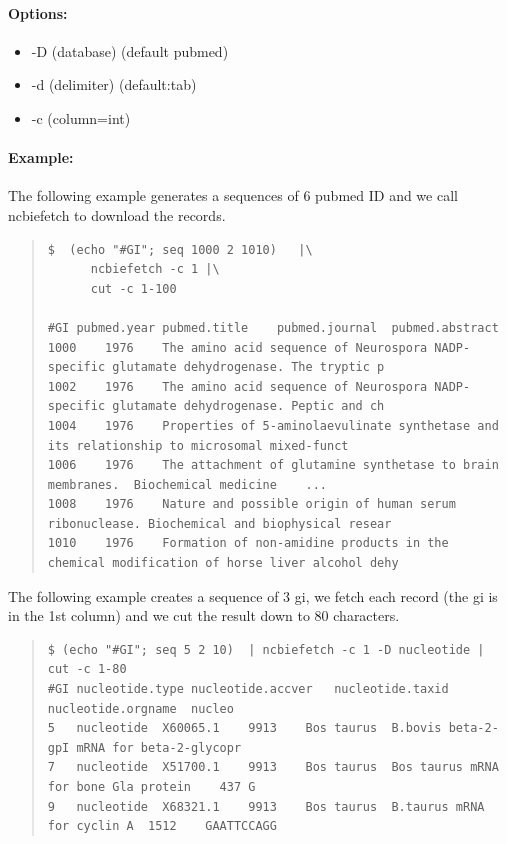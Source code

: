\documentclass[12pt]{article}
\begin{document}
\paragraph{Options:}
\begin{itemize}
\item-D (database) (default pubmed)
\item-d (delimiter) (default:tab)
\item-c (column=int) 
\end{itemize}
\paragraph{Example:}
The following example generates a sequences of 6 pubmed ID and we call ncbiefetch to download the records.
\begin{quote}
\begin{verbatim}
$  (echo "#GI"; seq 1000 2 1010)   |\
      ncbiefetch -c 1 |\
      cut -c 1-100

#GI	pubmed.year	pubmed.title	pubmed.journal	pubmed.abstract
1000	1976	The amino acid sequence of Neurospora NADP-specific glutamate dehydrogenase. The tryptic p
1002	1976	The amino acid sequence of Neurospora NADP-specific glutamate dehydrogenase. Peptic and ch
1004	1976	Properties of 5-aminolaevulinate synthetase and its relationship to microsomal mixed-funct
1006	1976	The attachment of glutamine synthetase to brain membranes.	Biochemical medicine	...
1008	1976	Nature and possible origin of human serum ribonuclease.	Biochemical and biophysical resear
1010	1976	Formation of non-amidine products in the chemical modification of horse liver alcohol dehy
\end{verbatim}
\end{quote}

The following example creates a sequence of 3 gi, we fetch each record (the gi is in the 1st column) and we cut the result down to 80 characters.

\begin{quote}
\begin{verbatim}
$ (echo "#GI"; seq 5 2 10)  | ncbiefetch -c 1 -D nucleotide | cut -c 1-80
#GI	nucleotide.type	nucleotide.accver	nucleotide.taxid	nucleotide.orgname	nucleo
5	nucleotide	X60065.1	9913	Bos taurus	B.bovis beta-2-gpI mRNA for beta-2-glycopr
7	nucleotide	X51700.1	9913	Bos taurus	Bos taurus mRNA for bone Gla protein	437	G
9	nucleotide	X68321.1	9913	Bos taurus	B.taurus mRNA for cyclin A	1512	GAATTCCAGG
\end{verbatim}
\end{quote}
\end{document}
